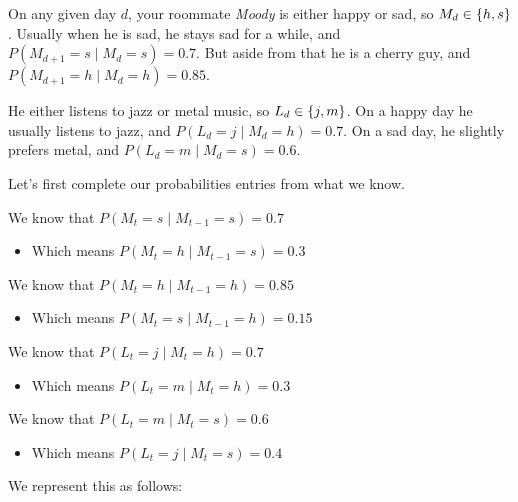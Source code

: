 \noindent{}

On any given day $d$, your roommate \textit{Moody} is either happy or sad, so $M_d \in \left\{h,s\right\}$. Usually when he is sad, he stays sad for a while, and $P(M_{d+1} = s \mid M_d = s) = 0.7$. But aside from that he is a cherry guy, and $P(M_{d+1} = h \mid M_d = h) = 0.85$. 

He either listens to jazz or metal music, so $L_d \in \left\{j,m\right\}$. On a happy day he usually listens to jazz, and $P(L_d = j \mid M_d = h) = 0.7$. On a sad day, he slightly prefers metal, and $P(L_d = m \mid M_d = s) = 0.6$.


Let's first complete our probabilities entries from what we know.

We know that $P(M_{t} = s \mid M_{t-1} = s) = 0.7$
\begin{itemize}
  \item Which means $P(M_{t} = h \mid M_{t-1} = s) = 0.3$
\end{itemize}

We know that $P(M_{t} = h \mid M_{t-1} = h) = 0.85$
\begin{itemize}
  \item Which means $P(M_{t} = s \mid M_{t-1} = h) = 0.15$
\end{itemize}

We know that $P(L_t = j \mid M_t = h) = 0.7$
\begin{itemize}
  \item Which means $P(L_t = m \mid M_t = h) = 0.3$
\end{itemize}

We know that $P(L_t = m \mid M_t = s) = 0.6$
\begin{itemize}
  \item Which means $P(L_t = j \mid M_t = s) = 0.4$
\end{itemize}

We represent this as follows:

